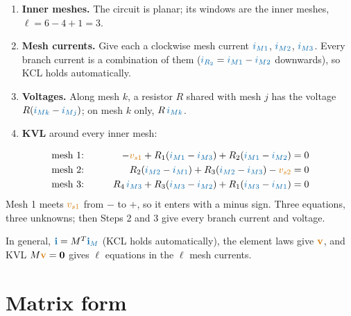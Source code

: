 \documentclass[11pt,a4paper]{article}
\newcommand{\Icol}[1]{\textcolor{ccur}{#1}}
\newcommand{\Vcol}[1]{\textcolor{cvolt}{#1}}
\newcommand{\im}[1]{\textcolor{ccur}{i_{M#1}}}
\newcommand{\meshcw}[4][0.36]{%
  \draw[ccur, thick, -{Stealth[length=2mm]}] ($(#2,#3)+(150:#1)$)
    arc[start angle=150, end angle=-150, radius=#1];
  \node[mlabst] at (#2,#3) {#4};}
\newcommand{\exM}[2]{%
  \ifnum#1=0
    \draw (0,2) to[american voltage source, l_=$\Vcol{v_{s1}}$] (0,0);
    \draw (7,0) to[american voltage source, l_=$\Vcol{v_{s2}}$] (7,2);
  \else
    \draw (0,0) to[american current source, l=$\Icol{i_s}$] (0,2);
    \draw (7,0) to[american voltage source, l_=$\Vcol{v_s}$] (7,2);
  \fi
  \draw (0,2) -- (0,3.5) to[R, l=$R_4$] (7,3.5) -- (7,2);
  \draw (0,2) to[R, l=$R_1$] (3.5,2) to[R, l=$R_3$] (7,2);
  \draw (3.5,2) to[R, l=$R_2$] (3.5,0);
  \draw (0,0) -- (7,0);
  \foreach \p in {(0,2),(3.5,2),(7,2),(3.5,0)} \fill \p circle (1.7pt);
  \ifnum#2>0
    \meshcw{1.6}{1.0}{1} \meshcw{5.5}{1.0}{2} \meshcw[0.33]{3.5}{2.8}{3}
  \fi}
\begin{document}
\begin{examplebox}
\begin{minipage}[c]{0.42\linewidth}
\centering
{}
\end{minipage}\hfill
\begin{minipage}[c]{0.56\linewidth}
\begin{enumerate}
  \item \textbf{Inner meshes.} The circuit is planar; its windows are the inner meshes,
        $\ell = 6 - 4 + 1 = 3$.
  \item \textbf{Mesh currents.} Give each a clockwise mesh current $\im{1}$, $\im{2}$, $\im{3}$.
        Every branch current is a combination of them ($\Icol{i_{R_2}} = \im{1} - \im{2}$
        downwards), so KCL holds automatically.
  \item \textbf{Voltages.} Along mesh $k$, a resistor $R$ shared with mesh $j$ has the voltage
        $R(\im{k} - \im{j})$; on mesh $k$ only, $R\,\im{k}$.
  \item \textbf{KVL} around every inner mesh:
\end{enumerate}
\end{minipage}
\begin{alignat*}{2}
  &\text{mesh 1:}\qquad & -\Vcol{v_{s1}} + R_1(\im{1} - \im{3}) + R_2(\im{1} - \im{2}) &= 0\\
  &\text{mesh 2:}\qquad & R_2(\im{2} - \im{1}) + R_3(\im{2} - \im{3}) - \Vcol{v_{s2}} &= 0\\
  &\text{mesh 3:}\qquad & R_4\,\im{3} + R_3(\im{3} - \im{2}) + R_1(\im{3} - \im{1}) &= 0
\end{alignat*}
Mesh 1 meets $\Vcol{v_{s1}}$ from $-$ to $+$, so it enters with a minus sign. Three equations,
three unknowns; then Steps 2 and 3 give every branch current and voltage.
\end{examplebox}

In general, $\Icol{\mathbf{i}} = M^T\Icol{\mathbf{i}_M}$ (KCL holds automatically), the element
laws give $\Vcol{\mathbf{v}}$, and KVL $M\Vcol{\mathbf{v}} = \mathbf{0}$ gives $\ell$ equations
in the $\ell$ mesh currents.

\section{Matrix form}
\end{document}
